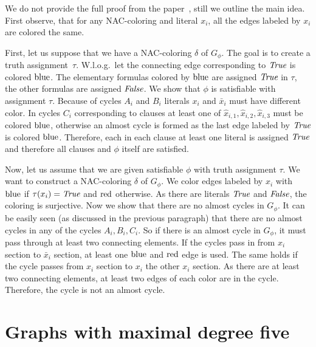 We do not provide the full proof from the paper~\cite{np_complete},
still we outline the main idea.
First observe, that for any NAC-coloring and literal \( x_i \),
all the edges labeled by \( x_i \) are colored the same.

First, let us suppose that we have a NAC-coloring \( \delta \) of \( G_\phi \).
The goal is to create a truth assignment~\( \tau \).
W.l.o.g.\ let the connecting edge corresponding to \( \textit{True} \) is colored \( \text{blue} \).
The elementary formulas colored by \( \text{blue} \) are assigned \( \textit{True} \) in \( \tau \),
the other formulas are assigned \( \textit{False} \).
We show that \( \phi \) is satisfiable with assignment \( \tau \).
Because of cycles \( A_i \) and \( B_i \) literals \( x_i \) and \( \bar{x}_i \)
must have different color. In cycles \( C_i \) corresponding to clauses
at least one of \( \hat{x}_{i,1}, \hat{x}_{i,2}, \hat{x}_{i,3} \) must be colored \( \text{blue} \),
otherwise an almost cycle is formed as the last edge labeled by \( \textit{True} \) is colored \( \text{blue} \).
Therefore, each in each clause at least one literal is assigned \( \textit{True} \)
and therefore all clauses and \( \phi \) itself are satisfied.

Now, let us assume that we are given satisfiable \( \phi \)
with truth assignment \( \tau \).
We want to construct a NAC-coloring \( \delta \) of \( G_\phi \).
We color edges labeled by \( x_i \) with \( \text{blue} \) if \( \tau(x_i) = \textit{True} \)
and \( \text{red} \) otherwise.
As there are literals \( \textit{True} \) and \( \textit{False} \), the coloring is surjective.
Now we show that there are no almost cycles in \( G_\phi \).
It can be easily seen (as discussed in the previous paragraph)
that there are no almost cycles in any of the cycles \( A_i, B_i, C_i \).
So if there is an almost cycle in \( G_\phi \), it must pass through
at least two connecting elements.
If the cycles pass in 
from \( x_i \) section to \( \bar{x}_i \) section, at least one \( \text{blue} \)
and \( \text{red} \) edge is used. The same holds if the cycle passes
from \( x_i \) section to \( x_i \) the other \( x_i \) section.
As there are at least two connecting elements, at least two edges of each color are in the cycle.
Therefore, the cycle is not an almost cycle.



\section{Graphs with maximal degree five}

